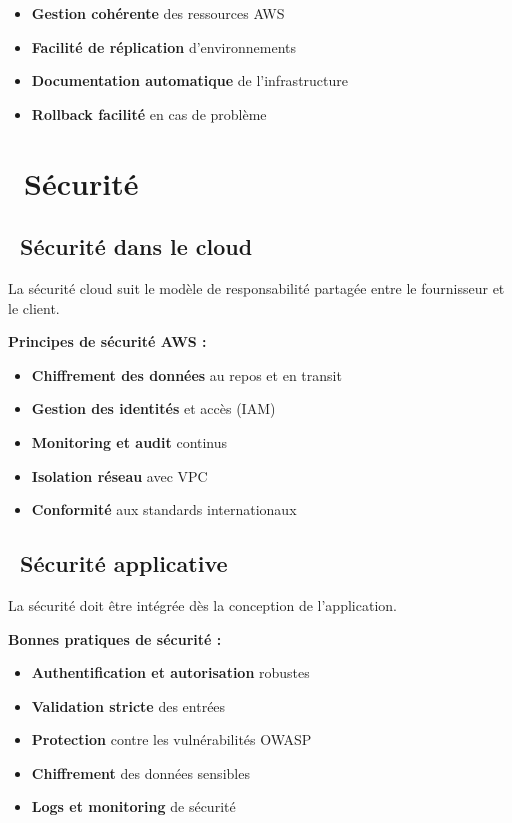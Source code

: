 \begin{warningbox}
\begin{itemize}
    \item \textcolor{primaryblue}{\textbf{Gestion cohérente}} des ressources AWS
    \item \textcolor{primaryblue}{\textbf{Facilité de réplication}} d'environnements
    \item \textcolor{primaryblue}{\textbf{Documentation automatique}} de l'infrastructure
    \item \textcolor{primaryblue}{\textbf{Rollback facilité}} en cas de problème
\end{itemize}
\end{warningbox}

\section{\faShieldAlt\ Sécurité}

\subsection{\faCloud\ Sécurité dans le cloud}

La sécurité cloud suit le modèle de responsabilité partagée entre le fournisseur et le client.

\textbf{\color{primaryblue}Principes de sécurité AWS :}
\begin{itemize}
    \item \textcolor{accentgreen}{\textbf{Chiffrement des données}} au repos et en transit
    \item \textcolor{accentgreen}{\textbf{Gestion des identités}} et accès (IAM)
    \item \textcolor{accentgreen}{\textbf{Monitoring et audit}} continus
    \item \textcolor{accentgreen}{\textbf{Isolation réseau}} avec VPC
    \item \textcolor{accentgreen}{\textbf{Conformité}} aux standards internationaux
\end{itemize}

\subsection{\faLock\ Sécurité applicative}

La sécurité doit être intégrée dès la conception de l'application.

\textbf{\color{primaryblue}Bonnes pratiques de sécurité :}
\begin{itemize}
    \item \textcolor{primaryblue}{\textbf{Authentification et autorisation}} robustes
    \item \textcolor{primaryblue}{\textbf{Validation stricte}} des entrées
    \item \textcolor{primaryblue}{\textbf{Protection}} contre les vulnérabilités OWASP
    \item \textcolor{primaryblue}{\textbf{Chiffrement}} des données sensibles
    \item \textcolor{primaryblue}{\textbf{Logs et monitoring}} de sécurité
\end{itemize}


